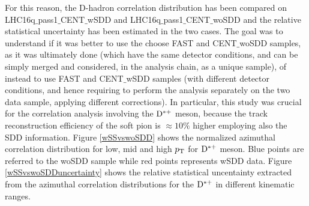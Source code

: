 For this reason, the D-hadron correlation distribution has been compared on LHC16q$\_$pass1$\_$CENT$\_$wSDD and LHC16q$\_$pass1$\_$CENT$\_$woSDD and the relative statistical uncertainty has been estimated in the two cases. The goal was to understand if it was better to use the choose FAST and CENT$\_$woSDD samples, as it was ultimately done (which have the same detector conditions, and can be simply merged and considered, in the analysis chain, as a unique sample), of instead to use FAST and CENT$\_$wSDD samples (with different detector conditions, and hence requiring to perform the analysis separately on the two data sample, applying different corrections).
In particular, this study was crucial for the correlation analysis involving the ${\rm D^{*+}}$ meson, because the track reconstruction efficiency of the soft pion is $\approx 10\%$ higher employing also the SDD information.
Figure \ref{wSSvswoSDD} shows the normalized azimuthal correlation distribution for low, mid and high $p_{\rm T}$ for ${\rm D^{*+}}$ meson. Blue points are referred to the woSDD sample while red points represents wSDD data. Figure \ref{wSSvswoSDDuncertainty} shows the relative statistical uncentainty extracted from the azimuthal correlation distributions for the ${\rm D^{*+}}$ in different kinematic ranges.

